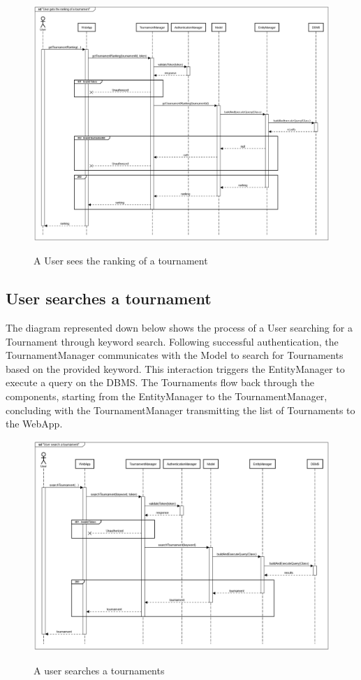 \documentclass{Configuration_Files/Template}
\begin{document}
\begin{figure}[H]
\centering
\includegraphics[scale = 0.33]{Images/diagrams/sequences/GetTournamentRanking.png}\\
\caption{A User sees the ranking of a tournament}
\end{figure}

\subsection{User searches a tournament}

The diagram represented down below shows the process of a User searching for a Tournament through keyword search. Following successful authentication, the TournamentManager communicates with the Model to search for Tournaments based on the provided keyword. This interaction triggers the EntityManager to execute a query on the DBMS. The Tournaments flow back through the components, starting from the EntityManager to the TournamentManager, concluding with the TournamentManager transmitting the list of Tournaments to the WebApp.

\begin{figure}[H]
\centering
\includegraphics[scale = 0.33]{Images/diagrams/sequences/searchTournament.png}\\
\caption{A user searches a tournaments }
\end{figure}
\end{document}
